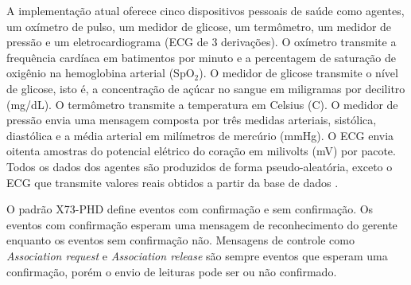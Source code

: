 A implementação atual oferece cinco dispositivos pessoais de saúde como agentes, um oxímetro de pulso, um medidor de glicose, um termômetro, um medidor de pressão e um eletrocardiograma (ECG de 3 derivações). O oxímetro transmite a frequência cardíaca em batimentos por minuto e a percentagem de saturação de oxigênio na hemoglobina arterial (SpO$_2$). O medidor de glicose transmite o nível de glicose, isto é, a concentração de açúcar no sangue em miligramas por decilitro (mg\//dL). O termômetro transmite a temperatura em Celsius (\textdegree C). O medidor de pressão envia uma mensagem composta por três medidas arteriais, sistólica, diastólica e a média arterial em milímetros de mercúrio (mmHg). O ECG envia oitenta amostras do potencial elétrico do coração em milivolts (mV) por pacote. 
Todos os dados dos agentes são produzidos de forma pseudo-aleatória, exceto o ECG que transmite valores reais obtidos a partir da base de dados \cite{b2}.

O padrão X73-PHD define eventos com confirmação e sem confirmação. Os eventos com confirmação esperam uma mensagem de reconhecimento do gerente enquanto os eventos sem confirmação não. Mensagens de controle como \textit{Association request} e \textit{Association release} são sempre eventos que esperam uma confirmação, porém o envio de leituras pode ser ou não confirmado.

